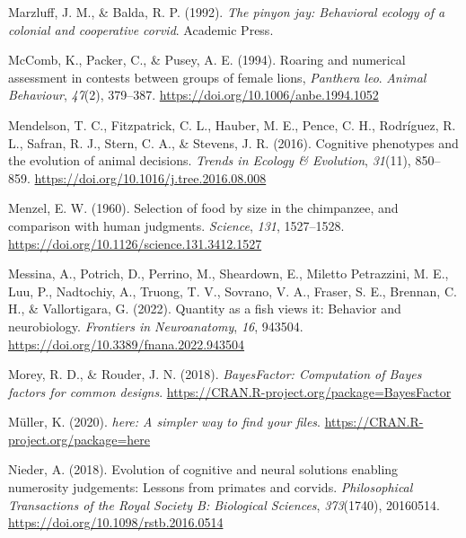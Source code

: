 \documentclass[
  ,pub,floatsintext]{apa6}
\newlength{\cslhangindent}
\newlength{\cslentryspacingunit} %
\newenvironment{CSLReferences}[2] %
 {%
  \setlength{\parindent}{0pt}
  \ifodd #1
  \let\oldpar\par
  \def\par{\hangindent=\cslhangindent\oldpar}
  \fi
  \setlength{\parskip}{#2\cslentryspacingunit}
 }%
 {}
\begin{document}
\begin{CSLReferences}{1}{0}
\leavevmode{}%
Marzluff, J. M., \& Balda, R. P. (1992). \emph{The pinyon jay: Behavioral ecology of a colonial and cooperative corvid}. {Academic Press}.

\leavevmode{}%
McComb, K., Packer, C., \& Pusey, A. E. (1994). Roaring and numerical assessment in contests between groups of female lions, \emph{{Panthera} leo}. \emph{Animal Behaviour}, \emph{47}(2), 379--387. \url{https://doi.org/10.1006/anbe.1994.1052}

\leavevmode{}%
Mendelson, T. C., Fitzpatrick, C. L., Hauber, M. E., Pence, C. H., Rodríguez, R. L., Safran, R. J., Stern, C. A., \& Stevens, J. R. (2016). Cognitive phenotypes and the evolution of animal decisions. \emph{Trends in Ecology \& Evolution}, \emph{31}(11), 850--859. \url{https://doi.org/10.1016/j.tree.2016.08.008}

\leavevmode{}%
Menzel, E. W. (1960). Selection of food by size in the chimpanzee, and comparison with human judgments. \emph{Science}, \emph{131}, 1527--1528. \url{https://doi.org/10.1126/science.131.3412.1527}

\leavevmode{}%
Messina, A., Potrich, D., Perrino, M., Sheardown, E., Miletto Petrazzini, M. E., Luu, P., Nadtochiy, A., Truong, T. V., Sovrano, V. A., Fraser, S. E., Brennan, C. H., \& Vallortigara, G. (2022). Quantity as a fish views it: {Behavior} and neurobiology. \emph{Frontiers in Neuroanatomy}, \emph{16}, 943504. \url{https://doi.org/10.3389/fnana.2022.943504}

\leavevmode{}%
Morey, R. D., \& Rouder, J. N. (2018). \emph{BayesFactor: Computation of {Bayes} factors for common designs}. \url{https://CRAN.R-project.org/package=BayesFactor}

\leavevmode{}%
Müller, K. (2020). \emph{{here}: A simpler way to find your files}. \url{https://CRAN.R-project.org/package=here}

\leavevmode{}%
Nieder, A. (2018). Evolution of cognitive and neural solutions enabling numerosity judgements: Lessons from primates and corvids. \emph{Philosophical Transactions of the Royal Society B: Biological Sciences}, \emph{373}(1740), 20160514. \url{https://doi.org/10.1098/rstb.2016.0514}


\end{CSLReferences}
\end{document}
